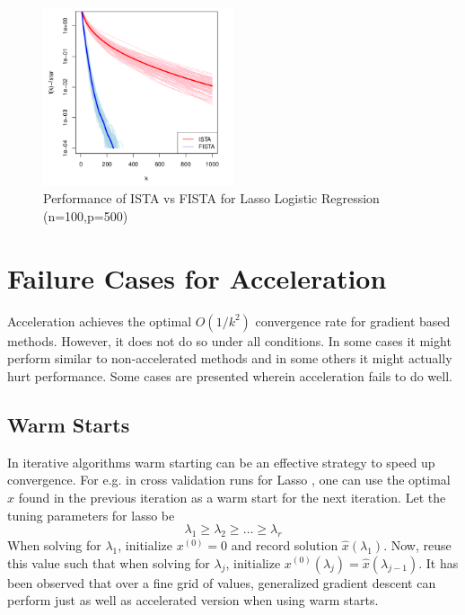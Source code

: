 \documentclass[twoside]{article}
\begin{document}
\begin{figure}[ht!]
\centering
\includegraphics[width=0.5\textwidth]{scribe2.png}
\caption{Performance of ISTA vs FISTA for Lasso Logistic Regression (n=100,p=500)}
\end{figure}

\pagebreak

\section{Failure Cases for Acceleration}
Acceleration achieves the optimal $O(1/k^2)$ convergence rate for gradient based methods. However, it does not do so under all conditions. In some cases it might perform similar to non-accelerated methods and in some others it might actually hurt performance. Some cases are presented wherein acceleration fails to do well. 

\subsection{Warm Starts}
In iterative algorithms warm starting can be an effective strategy to speed up convergence. For e.g. in cross validation runs for Lasso , one can use the optimal $\hat{x}$ found in the previous iteration as a warm start for the next iteration. Let the tuning parameters for lasso be 
\[
\lambda_1 \geq \lambda_2 \geq \dotsc \geq \lambda_r
\]
When solving for $\lambda_1$, initialize $x^{(0)} = 0$ and record solution $\hat{x}(\lambda_1)$. Now, reuse this value such that when solving for $\lambda_j$, initialize $x^{(0)}(\lambda_j) = \hat{x}(\lambda_{j-1})$. It has been observed that over a fine grid of values, generalized gradient descent can perform just as well as accelerated version when using warm starts.
\end{document}
